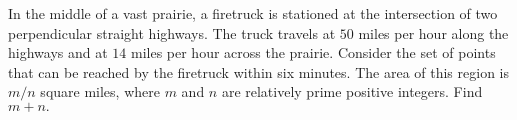 In the middle of a vast prairie, a firetruck is stationed at the intersection of two perpendicular straight highways. The truck travels at $50$ miles per hour along the highways and at $14$ miles per hour across the prairie. Consider the set of points that can be reached by the firetruck within six minutes. The area of this region is $m/n$ square miles, where $m$ and $n$ are relatively prime positive integers. Find $m+n.$